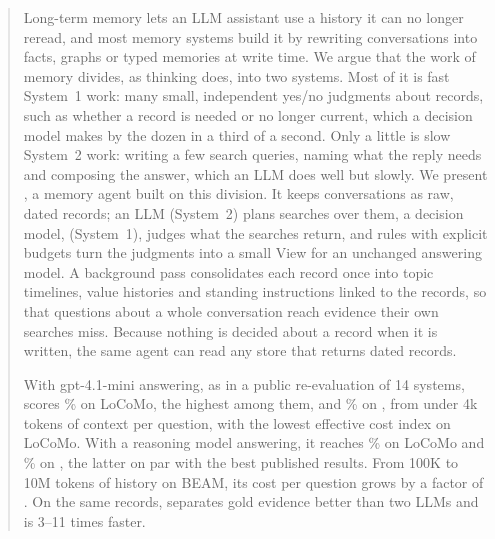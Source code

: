 \begin{abstract}
Long-term memory lets an LLM assistant use a history it can no longer reread, and most memory systems build it by rewriting conversations into facts, graphs or typed memories at write time.
We argue that the work of memory divides, as thinking does, into two systems.
Most of it is fast System~1 work: many small, independent yes/no judgments about records, such as whether a record is needed or no longer current, which a decision model makes by the dozen in a third of a second.
Only a little is slow System~2 work: writing a few search queries, naming what the reply needs and composing the answer, which an LLM does well but slowly.
We present \sys, a memory agent built on this division.
It keeps conversations as raw, dated records; an LLM (System~2) plans searches over them, a decision model, \jev{} (System~1), judges what the searches return, and rules with explicit budgets turn the judgments into a small View for an unchanged answering model.
A background pass consolidates each record once into topic timelines, value histories and standing instructions linked to the records, so that questions about a whole conversation reach evidence their own searches miss.
Because nothing is decided about a record when it is written, the same agent can read any store that returns dated records.

With gpt-4.1-mini answering, as in a public re-evaluation of 14 systems, \sys{} scores \finLoCoMo\% on LoCoMo, the highest among them, and \finLME\% on \lme, from under 4k tokens of context per question, with the lowest effective cost index on LoCoMo.
With a reasoning model answering, it reaches \dsFinLoCoMo\% on LoCoMo and \dsFinLME\% on \lme, the latter on par with the best published results.
From 100K to 10M tokens of history on BEAM, its cost per question grows by a factor of \beamTenCostRatioC.
On the same records, \jev{} separates gold evidence better than two LLMs and is 3--11 times faster.
\end{abstract}
